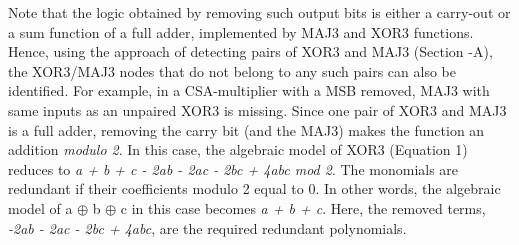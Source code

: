 Note that the logic obtained by removing such output bits is either a carry-out or a sum function of a full adder, implemented by MAJ3 and XOR3 functions. Hence, using the approach of detecting pairs of XOR3 and MAJ3 (Section -A), the XOR3/MAJ3 nodes that do not belong to any such pairs can also be identified. For example, in a CSA-multiplier with a MSB removed, MAJ3 with same inputs as an unpaired XOR3 is missing. Since one pair of XOR3 and MAJ3 is a full adder, removing the carry bit (and the MAJ3) makes the function an addition \textit{modulo 2}. In this case, the algebraic model of XOR3 (Equation 1) reduces to {\color{red}\textit{a + b + c - 2ab - 2ac - 2bc + 4abc mod 2}. The monomials are redundant if their coefficients modulo 2 equal to 0. In other words, the algebraic model of a $\oplus$ b $\oplus$ c in this case becomes \textit{a + b + c}}.
{\color{red}Here, the removed terms, \textit{-2ab - 2ac - 2bc + 4abc}, are the required redundant polynomials}. 



